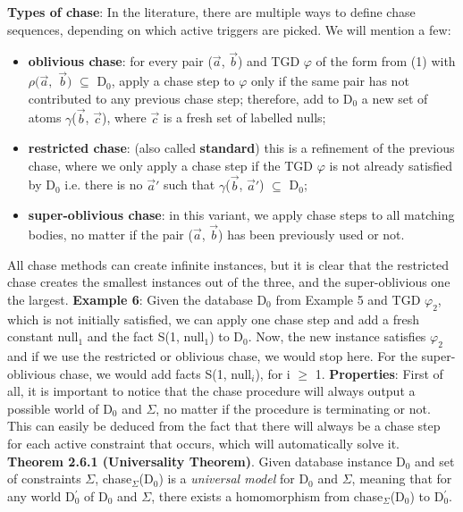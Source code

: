 \documentclass[11pt, a4paper, dvipsnames]{article}
\begin{document}
\textbf{Types of chase}: In the literature, there are multiple ways to define chase sequences, depending on which active triggers are picked. We will mention a few:
\begin{itemize}
	\item \textbf{oblivious chase}: for every pair ($\vec{a}$, $\vec{b}$) and TGD $\varphi$ of the form from (1) with $\rho(\vec{a},$ $\vec{b})$ $\subseteq$ D$_{0}$, apply a chase step to $\varphi$ only if the same pair has not contributed to any previous chase step; therefore, add to D$_{0}$ a new set of atoms $\gamma$($\vec{b}$, $\vec{c}$), where $\vec{c}$ is a fresh set of labelled nulls;
	\item \textbf{restricted chase}: (also called \textbf{standard}) this is a refinement of the previous chase, where we only apply a chase step if the TGD $\varphi$ is not already satisfied by D$_{0}$ i.e. there is no $\vec{a}'$ such that $\gamma$($\vec{b}$, $\vec{a}'$) $\subseteq$ D$_{0}$;
	\item \textbf{super-oblivious chase}: in this variant, we apply chase steps to all matching bodies, no matter if the pair ($\vec{a}$, $\vec{b}$) has been previously used or not.
\end{itemize}
All chase methods can create infinite instances, but it is clear that the restricted chase creates the smallest instances out of the three, and the super-oblivious one the largest.\newline
\textbf{Example 6}: Given the database D$_{0}$ from Example 5 and TGD $\varphi_{2}$, which is not initially satisfied, we can apply one chase step and add a fresh constant null$_{1}$ and the fact S(1, null$_{1}$) to D$_{0}$. Now, the new instance satisfies $\varphi_{2}$ and if we use the restricted or oblivious chase, we would stop here. For the super-oblivious chase, we would add facts S(1, null$_{i}$), for i $\geq$ 1. \newline
\textbf{Properties}: First of all, it is important to notice that the chase procedure will always output a possible world of D$_{0}$ and $\Sigma$, no matter if the procedure is terminating or not. This can easily be deduced from the fact that there will always be a chase step for each active constraint that occurs, which will automatically solve it.\newline
\textbf{Theorem 2.6.1 (Universality Theorem)}.  Given database instance D$_{0}$ and set of constraints $\Sigma$, chase$_{\Sigma}$(D$_{0}$) is a \textit{universal model} for D$_{0}$ and $\Sigma$, meaning that for any world D$^{'}_{0}$ of D$_{0}$ and $\Sigma$, there exists a homomorphism from chase$_{\Sigma}$(D$_{0}$) to D$^{'}_{0}$. \newline
\end{document}
